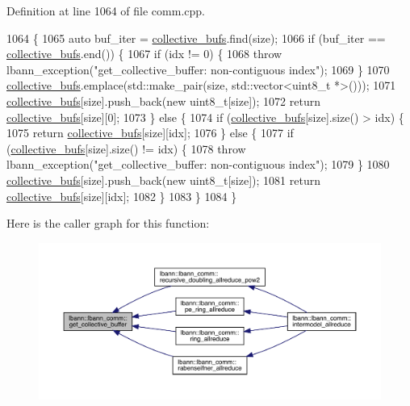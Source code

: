 Definition at line 1064 of file comm.\+cpp.


\begin{DoxyCode}
1064                                                                   \{
1065   \textcolor{keyword}{auto} buf\_iter = \hyperlink{classlbann_1_1lbann__comm_a9ada8c5daf902f43b599234c7519a765}{collective\_bufs}.find(size);
1066   \textcolor{keywordflow}{if} (buf\_iter == \hyperlink{classlbann_1_1lbann__comm_a9ada8c5daf902f43b599234c7519a765}{collective\_bufs}.end()) \{
1067     \textcolor{keywordflow}{if} (idx != 0) \{
1068       \textcolor{keywordflow}{throw} lbann\_exception(\textcolor{stringliteral}{"get\_collective\_buffer: non-contiguous index"});
1069     \}
1070     \hyperlink{classlbann_1_1lbann__comm_a9ada8c5daf902f43b599234c7519a765}{collective\_bufs}.emplace(std::make\_pair(size, std::vector<uint8\_t *>()));
1071     \hyperlink{classlbann_1_1lbann__comm_a9ada8c5daf902f43b599234c7519a765}{collective\_bufs}[size].push\_back(\textcolor{keyword}{new} uint8\_t[size]);
1072     \textcolor{keywordflow}{return} \hyperlink{classlbann_1_1lbann__comm_a9ada8c5daf902f43b599234c7519a765}{collective\_bufs}[size][0];
1073   \} \textcolor{keywordflow}{else} \{
1074     \textcolor{keywordflow}{if} (\hyperlink{classlbann_1_1lbann__comm_a9ada8c5daf902f43b599234c7519a765}{collective\_bufs}[size].size() > idx) \{
1075       \textcolor{keywordflow}{return} \hyperlink{classlbann_1_1lbann__comm_a9ada8c5daf902f43b599234c7519a765}{collective\_bufs}[size][idx];
1076     \} \textcolor{keywordflow}{else} \{
1077       \textcolor{keywordflow}{if} (\hyperlink{classlbann_1_1lbann__comm_a9ada8c5daf902f43b599234c7519a765}{collective\_bufs}[size].size() != idx) \{
1078         \textcolor{keywordflow}{throw} lbann\_exception(\textcolor{stringliteral}{"get\_collective\_buffer: non-contiguous index"});
1079       \}
1080       \hyperlink{classlbann_1_1lbann__comm_a9ada8c5daf902f43b599234c7519a765}{collective\_bufs}[size].push\_back(\textcolor{keyword}{new} uint8\_t[size]);
1081       \textcolor{keywordflow}{return} \hyperlink{classlbann_1_1lbann__comm_a9ada8c5daf902f43b599234c7519a765}{collective\_bufs}[size][idx];
1082     \}
1083   \}
1084 \}
\end{DoxyCode}
Here is the caller graph for this function\+:\nopagebreak
\begin{figure}[H]
\begin{center}
\leavevmode
\includegraphics[width=350pt]{classlbann_1_1lbann__comm_ae925ac5eaf2895717c709b252961b3bf_icgraph}
\end{center}
\end{figure}

